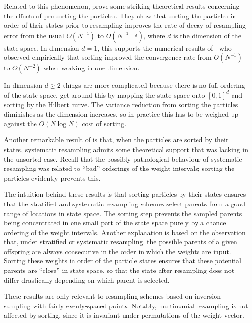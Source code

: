 Related to this phenomenon, \textcite{gerber2017} prove some striking theoretical results concerning the effects of pre-sorting the particles. They show that sorting the particles in order of their states prior to resampling improves the rate of decay of resampling error from the usual $O(N^{-1})$ to $O(N^{-1-\frac{1}{d}})$, where $d$ is the dimension of the state space. 
In dimension $d=1$, this supports the numerical results of \textcite{kitagawa1996}, who observed empirically that sorting improved the convergence rate from $O(N^{-1})$ to $O(N^{-2})$ when working in one dimension.

In dimension $d\geq2$ things are more complicated because there is no full ordering of the state space. \textcite{gerber2017} get around this by mapping the state space onto $[0,1]^d$ and sorting by the Hilbert curve. 
The variance reduction from sorting the particles diminishes as the dimension increases, so in practice this has to be weighed up against the $O(N\log N)$ cost of sorting.

Another remarkable result of \textcite{gerber2017} is that, when the particles are sorted by their states, systematic resampling admits some theoretical support that was lacking in the unsorted case.
Recall that the possibly pathological behaviour of systematic resampling was related to ``bad'' orderings of the weight intervals; sorting the particles evidently prevents this.

The intuition behind these results is that sorting particles by their states ensures that the stratified and systematic resampling schemes select parents from a good range of locations in state space. The sorting step prevents the sampled parents being concentrated in one small part of the state space purely by a chance ordering of the weight intervals.
Another explanation \parencite{webber2019, li2020} is based on the observation that, under stratified or systematic resampling, the possible parents of a given offspring are always consecutive in the order in which the weights are input. Sorting these weights in order of the particle states ensures that these potential parents are ``close'' in state space, so that the state after resampling does not differ drastically depending on which parent is selected.

These results are only relevant to resampling schemes based on inversion sampling with fairly evenly-spaced points. Notably, multinomial resampling is not affected by sorting, since it is invariant under permutations of the weight vector.





